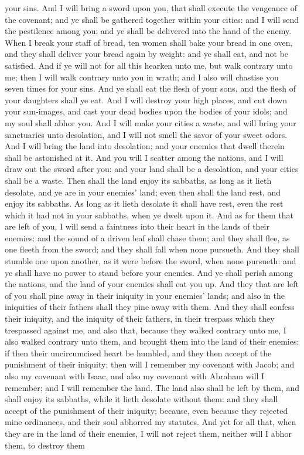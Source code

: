 your sins. And I will bring a sword upon you, that shall execute the vengeance of the covenant; and ye shall be gathered together within your cities: and I will send the pestilence among you; and ye shall be delivered into the hand of the enemy. When I break your staff of bread, ten women shall bake your bread in one oven, and they shall deliver your bread again by weight: and ye shall eat, and not be satisfied.  And if ye will not for all this hearken unto me, but walk contrary unto me; then I will walk contrary unto you in wrath; and I also will chastise you seven times for your sins. And ye shall eat the flesh of your sons, and the flesh of your daughters shall ye eat. And I will destroy your high places, and cut down your sun-images, and cast your dead bodies upon the bodies of your idols; and my soul shall abhor you. And I will make your cities a waste, and will bring your sanctuaries unto desolation, and I will not smell the savor of your sweet odors. And I will bring the land into desolation; and your enemies that dwell therein shall be astonished at it. And you will I scatter among the nations, and I will draw out the sword after you: and your land shall be a desolation, and your cities shall be a waste.  Then shall the land enjoy its sabbaths, as long as it lieth desolate, and ye are in your enemies’ land; even then shall the land rest, and enjoy its sabbaths. As long as it lieth desolate it shall have rest, even the rest which it had not in your sabbaths, when ye dwelt upon it. And as for them that are left of you, I will send a faintness into their heart in the lands of their enemies: and the sound of a driven leaf shall chase them; and they shall flee, as one fleeth from the sword; and they shall fall when none pursueth. And they shall stumble one upon another, as it were before the sword, when none pursueth: and ye shall have no power to stand before your enemies. And ye shall perish among the nations, and the land of your enemies shall eat you up. And they that are left of you shall pine away in their iniquity in your enemies’ lands; and also in the iniquities of their fathers shall they pine away with them.  And they shall confess their iniquity, and the iniquity of their fathers, in their trespass which they trespassed against me, and also that, because they walked contrary unto me, I also walked contrary unto them, and brought them into the land of their enemies: if then their uncircumcised heart be humbled, and they then accept of the punishment of their iniquity; then will I remember my covenant with Jacob; and also my covenant with Isaac, and also my covenant with Abraham will I remember; and I will remember the land. The land also shall be left by them, and shall enjoy its sabbaths, while it lieth desolate without them: and they shall accept of the punishment of their iniquity; because, even because they rejected mine ordinances, and their soul abhorred my statutes. And yet for all that, when they are in the land of their enemies, I will not reject them, neither will I abhor them, to destroy them 